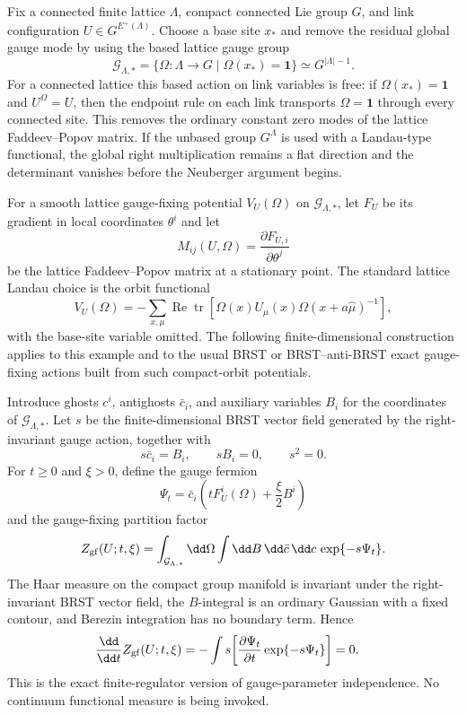 Fix a connected finite lattice \(\Lambda\), compact connected Lie group \(G\),
and link configuration \(U\in G^{E^+(\Lambda)}\).  Choose a base site \(x_\ast\)
and remove the residual global gauge mode by using the based lattice gauge
group
\begin{equation}
  \mathcal G_{\Lambda,\ast}
  =
  \{\Omega:\Lambda\to G\mid \Omega(x_\ast)=\mathbf 1\}
  \simeq
  G^{|\Lambda|-1}.
  \label{eq:based-lattice-gauge-group}
\end{equation}
For a connected lattice this based action on link variables is free: if
\(\Omega(x_\ast)=\mathbf 1\) and \(U^\Omega=U\), then the endpoint rule on each
link transports \(\Omega=\mathbf 1\) through every connected site.  This
removes the ordinary constant zero modes of the lattice Faddeev--Popov matrix.
If the unbased group \(G^\Lambda\) is used with a Landau-type functional, the
global right multiplication remains a flat direction and the determinant
vanishes before the Neuberger argument begins.

For a smooth lattice gauge-fixing potential \(V_U(\Omega)\) on
\(\mathcal G_{\Lambda,\ast}\), let \(F_U\) be its gradient in local coordinates
\(\theta^i\) and let
\[
  M_{ij}(U,\Omega)=\frac{\partial F_{U,i}}{\partial\theta^j}
\]
be the lattice Faddeev--Popov matrix at a stationary point.  The standard
lattice Landau choice is the orbit functional
\[
  V_U(\Omega)
  =
  -\sum_{x,\mu}
  \operatorname{Re}\operatorname{tr}
  \left[
    \Omega(x)U_\mu(x)\Omega(x+a\widehat\mu)^{-1}
  \right],
\]
with the base-site variable omitted.  The following finite-dimensional
construction applies to this example and to the usual BRST or BRST--anti-BRST
exact gauge-fixing actions built from such compact-orbit potentials.

Introduce ghosts \(c^i\), antighosts \(\bar c_i\), and auxiliary variables
\(B_i\) for the coordinates of \(\mathcal G_{\Lambda,\ast}\).  Let \(s\) be the
finite-dimensional BRST vector field generated by the right-invariant gauge
action, together with
\[
  s\bar c_i=B_i,\qquad sB_i=0,\qquad s^2=0 .
\]
For \(t\ge0\) and \(\xi>0\), define the gauge fermion
\[
  \Psi_t
  =
  \bar c_i
  \left(tF_U^i(\Omega)+\frac{\xi}{2}B^i\right)
\]
and the gauge-fixing partition factor
\begin{equation}
  Z_{\rm gf}(U;t,\xi)
  =
  \int_{\mathcal G_{\Lambda,\ast}}
  \dd\Omega
  \int\dd B\,\dd\bar c\,\dd c\,
  \exp\{-s\Psi_t\}.
  \label{eq:neuberger-gauge-fixing-factor}
\end{equation}
The Haar measure on the compact group manifold is invariant under the
right-invariant BRST vector field, the \(B\)-integral is an ordinary Gaussian
with a fixed contour, and Berezin integration has no boundary term.  Hence
\begin{equation}
\begin{aligned}
  \frac{\dd}{\dd t}Z_{\rm gf}(U;t,\xi)
  &=
  -\int
  s\!\left[
    \frac{\partial\Psi_t}{\partial t}
    \exp\{-s\Psi_t\}
  \right]
  =
  0 .
\end{aligned}
\label{eq:neuberger-t-independence}
\end{equation}
This is the exact finite-regulator version of gauge-parameter independence.  No
continuum functional measure is being invoked.

